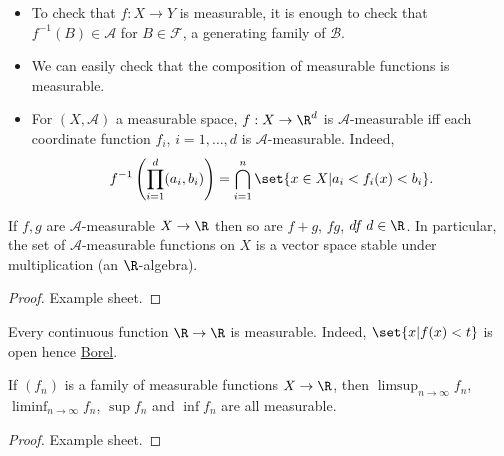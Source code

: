 \documentclass{article}
\newcommand{\1}[1]{\mathbbm{1}_{#1}}
\begin{document}
\begin{remark}
    \leavevmode
    \begin{itemize}
        \item To check that $f: X \to Y$ is measurable, it is enough to check that $f^{-1}(B) \in \mathcal{A}$ for $B \in \mathcal{F}$, a generating family of $\mathcal{B}$.
        \item We can easily check that the composition of measurable functions is measurable.
        \item For $(X, \mathcal{A})$ a measurable space, $f:X \to \R^d$ is $\mathcal{A}$-measurable iff each coordinate function $f_i$, $i = 1,\dotsc,d$ is $\mathcal{A}$-measurable.
            Indeed,
            \begin{equation*}
                f^{-1}\left(\prod_{i=1}^d (a_i, b_i)\right) = \bigcap_{i=1}^n \set{x \in X | a_i < f_i(x) < b_i}.
            \end{equation*}
    \end{itemize}
\end{remark}

\begin{prop}
    If $f, g$ are $\mathcal{A}$-measurable $X \to \R$ then so are $f+g$, $fg$, $d f \; d \in \R$.
    In particular, the set of $\mathcal{A}$-measurable functions on $X$ is a vector space stable under multiplication (an $\R$-algebra).
\end{prop}
\begin{proof}Example sheet.
\end{proof}

\begin{remark}
    Every continuous function $\R \to \R$ is measurable. Indeed, $\set{x | f(x) < t}$ is open hence \hyperlink{def:borelAlg}{Borel}.
\end{remark}

\begin{prop}
    If $(f_n)$ is a family of measurable functions $X \to \R$, then $\limsup_{n \to \infty} f_n$, $\liminf_{n \to \infty} f_n$, $\sup f_n$ and $\inf f_n$ are all measurable.
\end{prop}

\begin{proof}
    Example sheet.
\end{proof}

\end{document}
